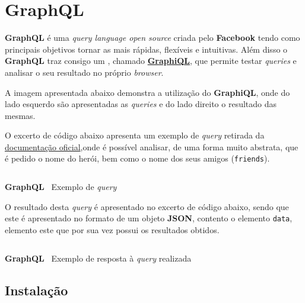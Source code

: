 \section{GraphQL}

\begin{minipage}[t]{.3\textwidth}
\end{minipage}
\begin{minipage}[t]{.7\textwidth}
	\minipagerestore
	\textbf{GraphQL} é uma \textit{query language open source} criada pelo \textbf{Facebook} tendo como principais objetivos tornar as  mais rápidas, flexíveis e intuitivas. Além disso o \textbf{GraphQL} traz consigo um , chamado \textbf{\href{https://github.com/graphql/graphiql}{GraphiQL}}, que permite testar \textit{queries} e analisar o seu resultado no próprio \textit{browser}.

	A imagem apresentada abaixo demonstra a utilização do \textbf{GraphiQL}, onde do lado esquerdo são apresentadas as \textit{queries} e do lado direito o resultado das mesmas.
\end{minipage}


O excerto de código abaixo apresenta um exemplo de \textit{query} retirada da \href{https://graphql.org/learn/queries/}{documentação oficial},onde é possível analisar, de uma forma muito abstrata, que é pedido o nome do herói, bem como o nome dos seus amigos (\texttt{friends}).

\begin{longlisting}
	\inputminted{text}{code/graphql/example-query.graphql}
	\caption{\textbf{GraphQL} \textemdash~Exemplo de \textit{query}}
\end{longlisting}

O resultado desta \textit{query} é apresentado no excerto de código abaixo, sendo que este é apresentado no formato de um objeto \textbf{JSON}, contento o elemento \texttt{data}, elemento este que por sua vez possui os resultados obtidos.

\begin{longlisting}
	\inputminted{json}{code/graphql/example-result.json}
	\caption{\textbf{GraphQL} \textemdash~Exemplo de resposta à \textit{query} realizada}
\end{longlisting}

\subsection{Instalação}

